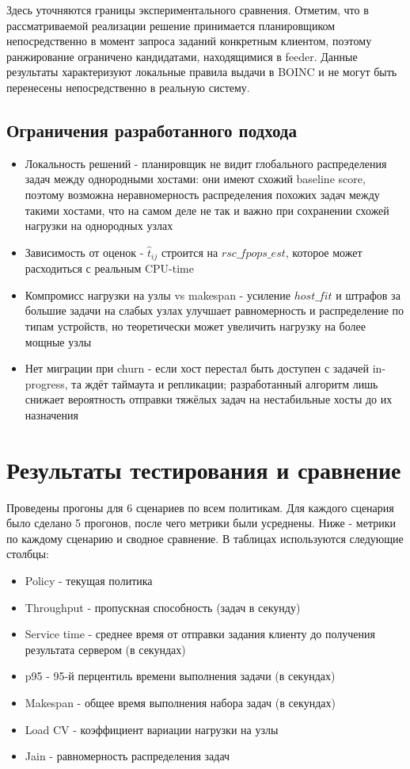 \documentclass[a4paper,12pt]{extarticle}
\begin{document}
Здесь уточняются границы экспериментального сравнения. Отметим, что в рассматриваемой реализации решение принимается планировщиком непосредственно в момент запроса заданий конкретным клиентом, поэтому ранжирование ограничено кандидатами, находящимися в feeder. Данные результаты характеризуют локальные правила выдачи в BOINC и не могут быть перенесены непосредственно в реальную систему.

\subsection{Ограничения разработанного подхода}
\begin{itemize}
    \item Локальность решений - планировщик не видит глобального распределения задач между однородными хостами: они имеют схожий baseline score, поэтому возможна неравномерность распределения похожих задач между такими хостами, что на самом деле не так и важно при сохранении схожей нагрузки на однородных узлах
    \item Зависимость от оценок - $\hat{t}_{ij}$ строится на $rsc\_fpops\_est$, которое может расходиться с реальным CPU-time
    \item Компромисс нагрузки на узлы vs makespan - усиление $host\_fit$ и штрафов за большие задачи на слабых узлах улучшает равномерность и распределение по типам устройств, но теоретически может увеличить нагрузку на более мощные узлы
    \item Нет миграции при churn - если хост перестал быть доступен с задачей in-progress, та ждёт таймаута и репликации; разработанный алгоритм лишь снижает вероятность отправки тяжёлых задач на нестабильные хосты до их назначения
\end{itemize}

\newpage
\section{Результаты тестирования и сравнение}
Проведены прогоны для 6 сценариев по всем политикам. Для каждого сценария было сделано 5 прогонов, после чего метрики были усреднены. Ниже - метрики по каждому сценарию и сводное сравнение. В таблицах используются следующие столбцы:

\begin{itemize}
    \item Policy - текущая политика
    \item Throughput - пропускная способность (задач в секунду)
    \item Service time - среднее время от отправки задания клиенту до получения результата сервером (в секундах)
    \item p95 - 95-й перцентиль времени выполнения задачи (в секундах)
    \item Makespan - общее время выполнения набора задач (в секундах)
    \item Load CV - коэффициент вариации нагрузки на узлы
    \item Jain - равномерность распределения задач
\end{itemize}
\end{document}

